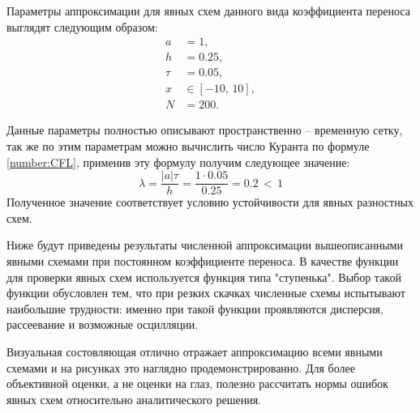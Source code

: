 \documentclass[a4paper,14pt]{extreport}
\begin{document}
Параметры аппроксимации для явных схем данного вида коэффициента переноса выглядят следующим образом:
\[
\begin{aligned}
a &= 1, \\
h &= 0.25, \\
\tau &= 0.05, \\
x &\in [-10,\,10], \\
N &= 200.
\end{aligned}
\]

Данные параметры полностью описывают пространственно -- временную сетку, так же по этим параметрам можно вычислить число Куранта по формуле \eqref{number:CFL}, применив эту формулу получим следующее значение:
 \[
 \lambda = \frac{|a|\tau}{h}=\frac{1 \cdot 0.05}{0.25} = 0.2\,<\,1
 \]
Полученное значение соответствует условию устойчивости для явных разностных схем.

Ниже будут приведены результаты численной аппроксимации вышеописанными явными схемами при постоянном коэффициенте переноса. В качестве функции для проверки явных схем  используется функция типа "ступенька". Выбор такой функции обусловлен тем, что при резких скачках численные схемы испытывают наибольшие трудности: именно при такой функции проявляются дисперсия, рассеевание и возможные осцилляции.

Визуальная состовляющая отлично отражает аппроксимацию всеми явными схемами и на рисунках это наглядно продемонстрированно. Для более объективной оценки, а не оценки на глаз, полезно рассчитать нормы ошибок явных схем относительно аналитического решения.
\end{document}

